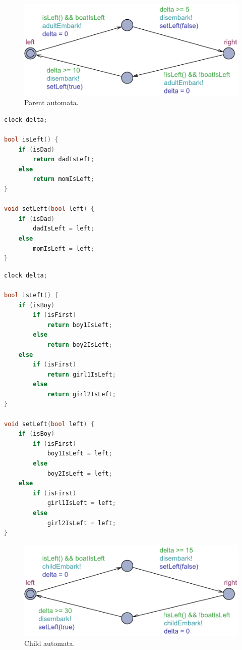 \documentclass[a4paper,12pt]{scrartcl}
\begin{document}
\begin{figure}[h]
\centering
\includegraphics[width=0.7\linewidth]{Parent.pdf}
\caption{Parent automata.}
\label{fig:parent}
\end{figure}

\begin{lstlisting}[language=CPP, label = lst:plugin_example, caption = Parent declaration.]
clock delta;

bool isLeft() {
    if (isDad)
        return dadIsLeft;
    else
        return momIsLeft;
}

void setLeft(bool left) {
    if (isDad)
        dadIsLeft = left;
    else
        momIsLeft = left;
}
\end{lstlisting}

\begin{lstlisting}[language=CPP, label = lst:plugin_example, caption = Child declaration.]
clock delta;

bool isLeft() {
    if (isBoy)
        if (isFirst)
            return boy1IsLeft;
        else
            return boy2IsLeft;
    else
        if (isFirst)
            return girl1IsLeft;
        else
            return girl2IsLeft;
}

void setLeft(bool left) {
    if (isBoy)
        if (isFirst)
            boy1IsLeft = left;
        else
            boy2IsLeft = left;
    else
        if (isFirst)
            girl1IsLeft = left;
        else
            girl2IsLeft = left;
}
\end{lstlisting}

\begin{figure}[h]
\centering
\includegraphics[width=0.7\linewidth]{Child.pdf}
\caption{Child automata.}
\label{fig:child}
\end{figure}
\end{document}
